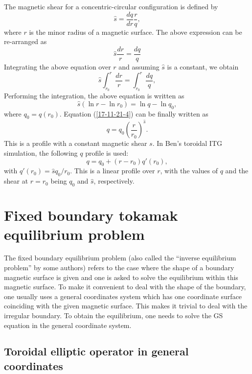 \documentclass{article}
\begin{document}
The magnetic shear for a concentric-circular configuration is defined by
\begin{equation}
  \hat{s} = \frac{d q}{d r}  \frac{r}{q},
\end{equation}
where $r$ is the minor radius of a magnetic surface. The above expression can
be re-arranged as
\begin{equation}
  \hat{s} \frac{d r}{r} = \frac{d q}{q}
\end{equation}
Integrating the above equation over $r$ and assuming $\hat{s}$ is a constant,
we obtain
\begin{equation}
  \hat{s} \int_{r_0}^r \frac{d r}{r} = \int_{r_0}^r \frac{d q}{q},
\end{equation}
Performing the integration, the above equation is written as
\begin{equation}
  \label{17-11-21-4} \hat{s} (\ln r - \ln r_0) = \ln q - \ln q_0,
\end{equation}
where $q_0 = q (r_0)$. Equation (\ref{17-11-21-4}) can be finally written as
\begin{equation}
  q = q_0 \left( \frac{r}{r_0} \right)^{\hat{s}} .
\end{equation}
This is a profile with a constant magnetic shear $s$. In Ben's toroidal ITG
simulation, the following $q$ profile is used:
\begin{equation}
  q = q_0 + (r - r_0) q' (r_0),
\end{equation}
with $q' (r_0) = \hat{s} q_0 / r_0$. This is a linear profile over $r$, with
the values of $q$ and the shear at $r = r_0$ being $q_0$ and $\hat{s}$,
respectively.

\section{Fixed boundary tokamak equilibrium problem}

The fixed boundary equilibrium problem (also called the ``inverse equilibrium
problem'' by some authors) refers to the case where the shape of a boundary
magnetic surface is given and one is asked to solve the equilibrium within
this magnetic surface. To make it convenient to deal with the shape of the
boundary, one usually uses a general coordinates system which has one
coordinate surface coinciding with the given magnetic surface. This makes it
trivial to deal with the irregular boundary. To obtain the equilibrium, one
needs to solve the GS equation in the general coordinate system.

\subsection{Toroidal elliptic operator in general coordinates}
\end{document}
